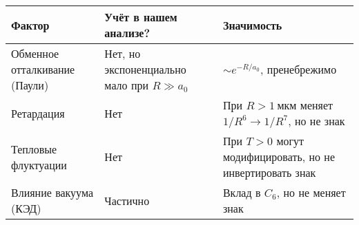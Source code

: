 \documentclass[11pt]{article}
\begin{document}
\begin{longtable}[]{@{}lll@{}}
\toprule
\begin{minipage}[b]{0.11\columnwidth}\raggedright\strut
Фактор\strut
\end{minipage} & \begin{minipage}[b]{0.32\columnwidth}\raggedright\strut
Учёт в нашем анализе?\strut
\end{minipage} & \begin{minipage}[b]{0.15\columnwidth}\raggedright\strut
Значимость\strut
\end{minipage}\tabularnewline
\midrule
\endhead
\begin{minipage}[t]{0.11\columnwidth}\raggedright\strut
Обменное отталкивание (Паули)\strut
\end{minipage} & \begin{minipage}[t]{0.32\columnwidth}\raggedright\strut
Нет, но экспоненциально мало при \(R \gg a_0\)\strut
\end{minipage} & \begin{minipage}[t]{0.15\columnwidth}\raggedright\strut
\(\sim e^{-R/a_0}\), пренебрежимо\strut
\end{minipage}\tabularnewline
\begin{minipage}[t]{0.11\columnwidth}\raggedright\strut
Ретардация\strut
\end{minipage} & \begin{minipage}[t]{0.32\columnwidth}\raggedright\strut
Нет\strut
\end{minipage} & \begin{minipage}[t]{0.15\columnwidth}\raggedright\strut
При \(R > 1~\text{мкм}\) меняет \(1/R^6 \to 1/R^7\), но не знак\strut
\end{minipage}\tabularnewline
\begin{minipage}[t]{0.11\columnwidth}\raggedright\strut
Тепловые флуктуации\strut
\end{minipage} & \begin{minipage}[t]{0.32\columnwidth}\raggedright\strut
Нет\strut
\end{minipage} & \begin{minipage}[t]{0.15\columnwidth}\raggedright\strut
При \(T > 0\) могут модифицировать, но не инвертировать знак\strut
\end{minipage}\tabularnewline
\begin{minipage}[t]{0.11\columnwidth}\raggedright\strut
Влияние вакуума (КЭД)\strut
\end{minipage} & \begin{minipage}[t]{0.32\columnwidth}\raggedright\strut
Частично\strut
\end{minipage} & \begin{minipage}[t]{0.15\columnwidth}\raggedright\strut
Вклад в \(C_6\), но не меняет знак\strut
\end{minipage}\tabularnewline
\bottomrule
\end{longtable}
\end{document}
